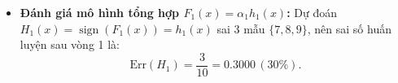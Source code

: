 \documentclass[11pt, a4paper]{article}
\begin{document}
\begin{itemize}
\begin{itemize}
        \[
        D_2(i) = \frac{D_1(i) e^{-\alpha_1}}{Z_1} = \frac{0.1 \times \sqrt{3/7}}{2\sqrt{21/100}} = \frac{1}{14} \approx 0.07143.
        \]
        \item Với 3 mẫu phân loại sai ($i \in \{7, 8, 9\}$):
        \[
        D_2(i) = \frac{D_1(i) e^{\alpha_1}}{Z_1} = \frac{0.1 \times \sqrt{7/3}}{2\sqrt{21/100}} = \frac{1}{6} \approx 0.16667.
        \]
    \end{itemize}
    Kiểm tra tổng: $7 \times \frac{1}{14} + 3 \times \frac{1}{6} = \frac{1}{2} + \frac{1}{2} = 1$.
    \item \textbf{Đánh giá mô hình tổng hợp $F_1(x) = \alpha_1 h_1(x)$:}
    Dự đoán $H_1(x) = \operatorname{sign}(F_1(x)) = h_1(x)$ sai 3 mẫu $\{7, 8, 9\}$, nên sai số huấn luyện sau vòng 1 là:
    \[
    \text{Err}(H_1) = \frac{3}{10} = 0.3000 \, (30\%).
    \]
\end{itemize}
\end{document}
